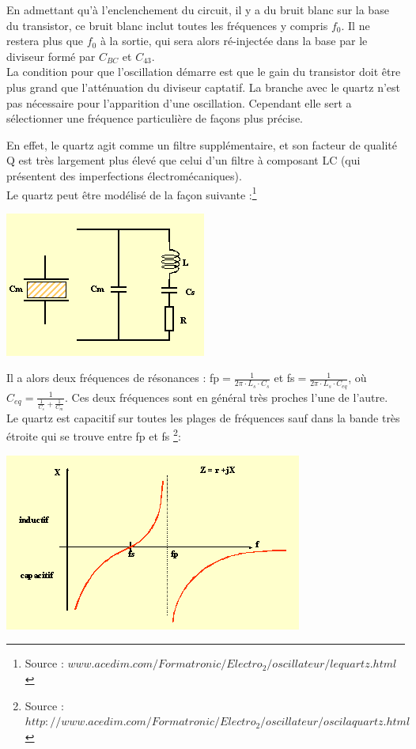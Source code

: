 \documentclass{article}
\begin{document}
En admettant qu'à l'enclenchement du circuit, il y a du bruit blanc sur la base du transistor, ce bruit blanc inclut toutes les fréquences y compris $f_0$. Il ne restera plus que $f_0$ à la sortie, qui sera alors ré-injectée dans la base par le diviseur formé par $C_{BC}$ et $C_{43}$.\\
La condition pour que l'oscillation démarre est que le gain du transistor doit être plus grand que l'atténuation du diviseur captatif. La branche avec le quartz n'est pas nécessaire pour l'apparition d'une oscillation. Cependant elle sert a sélectionner une fréquence particulière de façons plus précise.

En effet, le quartz agit comme un filtre supplémentaire, et son facteur de qualité Q est très largement plus élevé que celui d'un filtre à composant LC (qui présentent des imperfections électromécaniques).\\

Le quartz peut être modélisé de la façon suivante :\footnote{Source : $www.acedim.com/Formatronic/Electro_2/oscillateur/lequartz.html$}
\begin{center}
\includegraphics[width=0.4\linewidth]{modele_quartz.png}
\end{center}
Il a alors deux fréquences de résonances : fp$=\frac{1}{2\pi \cdot L_s \cdot C_s}$ et fs$=\frac{1}{2\pi \cdot L_s \cdot C_{eq}}$, où $C_{eq} = \frac{1}{\frac{1}{C_s} + \frac{1}{C_m}}$. Ces deux fréquences sont en général très proches l'une de l'autre.\\
Le quartz est capacitif sur toutes les plages de fréquences sauf dans la bande très étroite qui se trouve entre fp et fs \footnote{Source : $http://www.acedim.com/Formatronic/Electro_2/oscillateur/oscilaquartz.html$}:
\begin{center}
\includegraphics[width=0.4\linewidth]{impedence_quartz.png}
\end{center}
\end{document}
